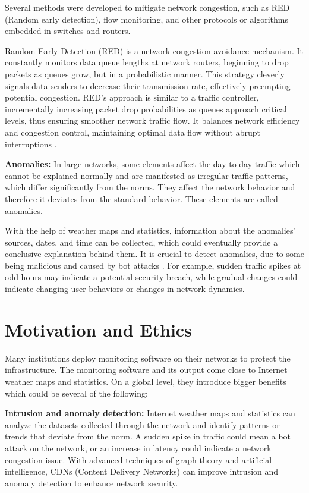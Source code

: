 \documentclass[sigconf,authorversion,nonacm]{acmart}
\begin{document}
Several methods were developed to mitigate network congestion, such as RED (Random early detection), flow monitoring, and other protocols or algorithms embedded in switches and routers.

Random Early Detection (RED) is a network congestion avoidance mechanism. It constantly monitors data queue lengths at network routers, beginning to drop packets as queues grow, but in a probabilistic manner. This strategy cleverly signals data senders to decrease their transmission rate, effectively preempting potential congestion. RED's approach is similar to a traffic controller, incrementally increasing packet drop probabilities as queues approach critical levels, thus ensuring smoother network traffic flow. It balances network efficiency and congestion control, maintaining optimal data flow without abrupt interruptions \cite{251892}.

\textbf{Anomalies:} In large networks, some elements affect the day-to-day traffic which cannot be explained normally and are manifested as irregular traffic patterns, which differ significantly from the norms. They affect the network behavior and therefore it deviates from the standard behavior. These elements are called anomalies. 

With the help of weather maps and statistics, information about the anomalies' sources, dates, and time can be collected, which could eventually provide a conclusive explanation behind them. It is crucial to detect anomalies, due to some being malicious and caused by bot attacks \cite{6524462}. For example, sudden traffic spikes at odd hours may indicate a potential security breach, while gradual changes could indicate changing user behaviors or changes in network dynamics.

\section{Motivation and Ethics}
Many institutions deploy monitoring software on their networks to protect the infrastructure. The monitoring software and its output come close to Internet weather maps and statistics. On a global level, they introduce bigger benefits which could be several of the following:

\textbf{Intrusion and anomaly detection:} Internet weather maps and statistics can analyze the datasets collected through the network and identify patterns or trends that deviate from the norm. A sudden spike in traffic could mean a bot attack on the network, or an increase in latency could indicate a network congestion issue. With advanced techniques of graph theory and artificial intelligence, CDNs (Content Delivery Networks) can improve intrusion and anomaly detection to enhance network security.
\end{document}
